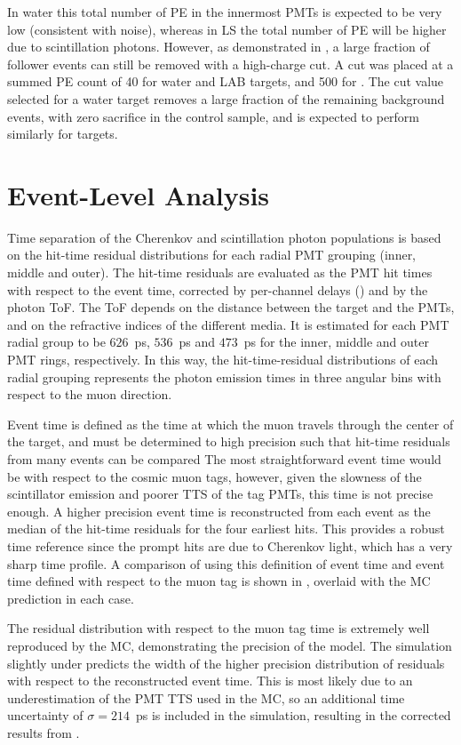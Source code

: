 In water this total number of PE in the innermost PMTs is expected to be very low (consistent with noise), whereas in LS the total number of PE will be higher due to scintillation photons.  
However, as demonstrated in , a large fraction of follower events can still be removed with a high-charge cut.   
A cut was placed at a summed PE count of 40 for water and LAB targets, and 500 for {\labppo}.  
The cut value selected for a water target removes a large fraction of the remaining background events, with zero sacrifice in the control sample, and is expected to perform similarly for {\labppo} targets.

\section{Event-Level Analysis}\label{s:recon}

Time separation of the Cherenkov and scintillation photon populations is based on the hit-time residual distributions for each radial PMT grouping (inner, middle and outer).  
The hit-time residuals are evaluated as the PMT hit times with respect to the event time, corrected by per-channel delays () and by the photon ToF.  
The ToF depends on the distance between the target and the PMTs, and on the refractive indices of the different media. 
It is estimated for each PMT radial group to be $626$~ps, $536$~ps and $473$~ps for the inner, middle and outer PMT rings, respectively.
In this way, the hit-time-residual distributions of each radial grouping represents the photon emission times in three angular bins with respect to the muon direction.

Event time is defined as the time at which the muon travels through the center of the target, and must be determined to high precision such that hit-time residuals from many events can be compared
The most straightforward event time would be with respect to the cosmic muon tags, however, given the slowness of the scintillator emission and poorer TTS of the tag PMTs, this time is not precise enough.
A higher precision event time is reconstructed from each event as the median of the hit-time residuals for the four earliest hits.
This provides a robust time reference since the prompt hits are due to Cherenkov light, which has a very sharp time profile.
A comparison of using this definition of event time and event time defined with respect to the muon tag is shown in , overlaid with the MC prediction in each case.  

The residual distribution with respect to the muon tag time is extremely well reproduced by the MC, demonstrating the precision of the model.
The simulation slightly under predicts the width of the higher precision distribution of residuals with respect to the reconstructed event time.  
This is most likely due to an underestimation of the PMT TTS used in the MC, so an additional time uncertainty of $\sigma=214$~ps is included in the simulation, resulting in the corrected results from .

